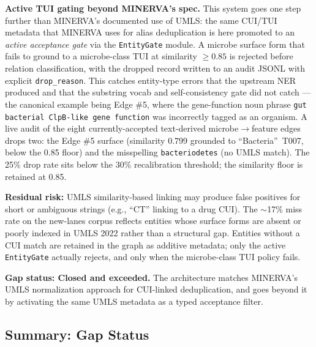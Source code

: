 \documentclass[12pt, letterpaper]{article}
\begin{document}
\textbf{Active TUI gating beyond MINERVA's spec.} This system goes one step further than MINERVA's documented use of UMLS: the same CUI/TUI metadata that MINERVA uses for alias deduplication is here promoted to an \emph{active acceptance gate} via the \texttt{EntityGate} module. A microbe surface form that fails to ground to a microbe-class TUI at similarity $\geq 0.85$ is rejected before relation classification, with the dropped record written to an audit JSONL with explicit \texttt{drop\_reason}. This catches entity-type errors that the upstream NER produced and that the substring vocab and self-consistency gate did not catch --- the canonical example being Edge \#5, where the gene-function noun phrase \texttt{gut bacterial ClpB-like gene function} was incorrectly tagged as an organism. A live audit of the eight currently-accepted text-derived microbe$\to$feature edges drops two: the Edge \#5 surface (similarity 0.799 grounded to ``Bacteria''~T007, below the 0.85 floor) and the misspelling \texttt{bacteriodetes} (no UMLS match). The 25\% drop rate sits below the 30\% recalibration threshold; the similarity floor is retained at 0.85.

\textbf{Residual risk:} UMLS similarity-based linking may produce false positives for short or ambiguous strings (e.g., ``CT'' linking to a drug CUI). The $\sim$17\% miss rate on the new-lanes corpus reflects entities whose surface forms are absent or poorly indexed in UMLS 2022 rather than a structural gap. Entities without a CUI match are retained in the graph as additive metadata; only the active \texttt{EntityGate} actually rejects, and only when the microbe-class TUI policy fails.

\textbf{Gap status: Closed and exceeded.} The architecture matches MINERVA's UMLS normalization approach for CUI-linked deduplication, and goes beyond it by activating the same UMLS metadata as a typed acceptance filter.

\subsection{Summary: Gap Status}
\end{document}
